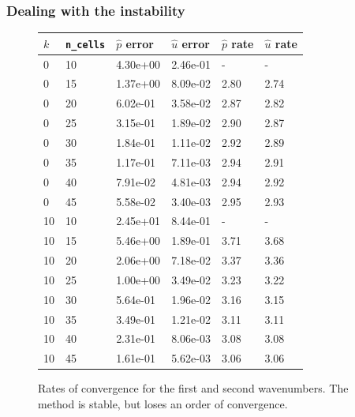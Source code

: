 \documentclass[8pt]{beamer}
\begin{document}
\begin{frame}
    \frametitle{Dealing with the instability}
    \begin{figure}
        \centering
        \begin{tabular}{| l | l | l | l | l | l |}
            \hline
            \(k\) & \texttt{n\_cells} &
            \(\hat{p}\) error & \(\hat{u}\) error &
            \(\hat{p}\) rate & \(\hat{u}\) rate                               \\
            \hline
            0  & 10 & 4.30e+00 & 2.46e-01 & -   & -                           \\
            0  & 15 & 1.37e+00 & 8.09e-02 & 2.80 & 2.74                       \\
            0  & 20 & 6.02e-01 & 3.58e-02 & 2.87 & 2.82                       \\
            0  & 25 & 3.15e-01 & 1.89e-02 & 2.90 & 2.87                       \\
            0  & 30 & 1.84e-01 & 1.11e-02 & 2.92 & 2.89                       \\
            0  & 35 & 1.17e-01 & 7.11e-03 & 2.94 & 2.91                       \\
            0  & 40 & 7.91e-02 & 4.81e-03 & 2.94 & 2.92                       \\
            0  & 45 & 5.58e-02 & 3.40e-03 & 2.95 & 2.93                       \\
            \hline
            10 & 10 & 2.45e+01 & 8.44e-01 & -    & -                          \\
            10 & 15 & 5.46e+00 & 1.89e-01 & 3.71 & 3.68                       \\
            10 & 20 & 2.06e+00 & 7.18e-02 & 3.37 & 3.36                       \\
            10 & 25 & 1.00e+00 & 3.49e-02 & 3.23 & 3.22                       \\
            10 & 30 & 5.64e-01 & 1.96e-02 & 3.16 & 3.15                       \\
            10 & 35 & 3.49e-01 & 1.21e-02 & 3.11 & 3.11                       \\
            10 & 40 & 2.31e-01 & 8.06e-03 & 3.08 & 3.08                       \\
            10 & 45 & 1.61e-01 & 5.62e-03 & 3.06 & 3.06                       \\
            \hline
        \end{tabular}

        \caption{Rates of convergence for the first and second wavenumbers. The
        method is stable, but loses an order of convergence.}
    \end{figure}
\end{frame}
\end{document}
